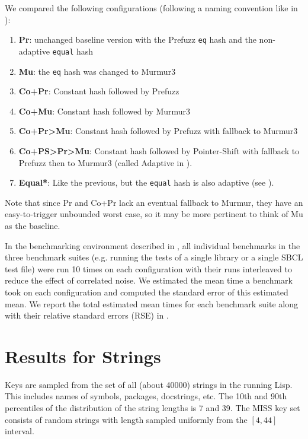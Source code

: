 \documentclass[sigconf]{acmart}
\newcommand*\lisp[1]{\texttt{#1}}
\renewcommand{\label}[1]{%
    \gdef\sfname{sf:##1}}%
\begin{document}
We compared the following configurations (following a naming convention like in ):
\begin{enumerate}
\item \textbf{Pr}: unchanged baseline version with the Prefuzz \lisp{eq} hash and the non-adaptive \lisp{equal} hash
\item \textbf{Mu}: the \lisp{eq} hash was changed to Murmur3
\item \textbf{Co+Pr}: Constant hash followed by Prefuzz
\item \textbf{Co+Mu}: Constant hash followed by Murmur3
\item \textbf{Co+Pr>Mu}: Constant hash followed by Prefuzz with fallback to Murmur3
\item \textbf{Co+PS>Pr>Mu}: Constant hash followed by Pointer-Shift with fallback to Prefuzz then to Murmur3 (called Adaptive in ).
\item \textbf{Equal*}: Like the previous, but the \lisp{equal} hash is also adaptive (see ).
\end{enumerate}
Note that since Pr and Co+Pr lack an eventual fallback to Murmur, they have an easy-to-trigger unbounded worst case, so it may be more pertinent to think of Mu as the baseline.

In the benchmarking environment described in , all individual benchmarks in the three benchmark suites (e.g. running the tests of a single library or a single SBCL test file) were run 10 times on each configuration with their runs interleaved to reduce the effect of correlated noise.
We estimated the mean time a benchmark took on each configuration and computed the standard error of this estimated mean.
We report the total estimated mean times for each benchmark suite along with their relative standard errors (RSE) in .


\raggedbottom

\clearpage
\section{Results for Strings}
\label{sec:results-for-strings}

Keys are sampled from the set of all (about \num{40000}) strings in the running Lisp.
This includes names of symbols, packages, docstrings, etc.
The 10th and 90th percentiles of the distribution of the string lengths is 7 and 39.
The MISS key set consists of random strings with length sampled uniformly from the $[4,44]$ interval.
\end{document}
